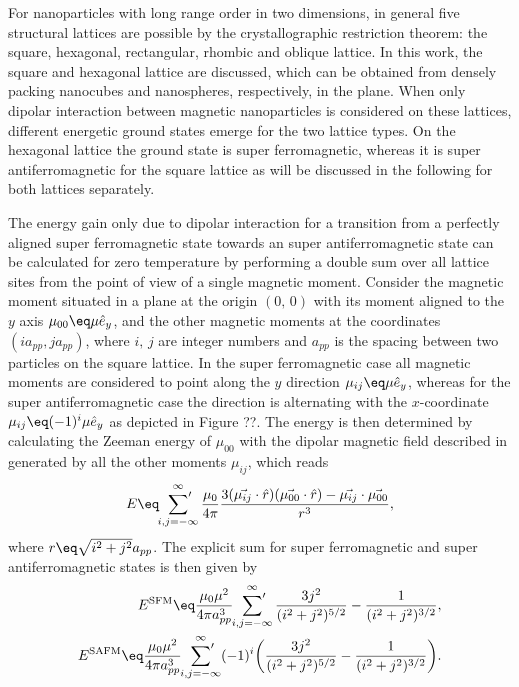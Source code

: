 \documentclass[\main/dresen_thesis.tex]{subfiles}
\begin{document}
  For nanoparticles with long range order in two dimensions, in general five structural lattices are possible by the crystallographic restriction theorem: the square, hexagonal, rectangular, rhombic and oblique lattice.
  In this work, the square and hexagonal lattice are discussed, which can be obtained from densely packing nanocubes and nanospheres, respectively, in the plane.
  When only dipolar interaction between magnetic nanoparticles is considered on these lattices, different energetic ground states emerge for the two lattice types.
  On the hexagonal lattice the ground state is super ferromagnetic, whereas it is super antiferromagnetic for the square lattice as will be discussed in the following for both lattices separately.


  The energy gain only due to dipolar interaction for a transition from a perfectly aligned super ferromagnetic state towards an super antiferromagnetic state can be calculated for zero temperature by performing a double sum over all lattice sites from the point of view of a single magnetic moment.
  Consider the magnetic moment situated in a plane at the origin $(0, \,0)$ with its moment aligned to the $y$ axis $\mu_{00} \eq \mu \hat{e}_y$, and the other magnetic moments at the coordinates $(i a_{pp}, j a_{pp})$, where $i,\, j$ are integer numbers and $a_{pp}$ is the spacing between two particles on the square lattice.
  In the super ferromagnetic case all magnetic moments are considered to point along the $y$ direction $\mu_{ij} \eq \mu \hat{e}_y$, whereas for the super antiferromagnetic case the direction is alternating with the $x$-coordinate $\mu_{ij} \eq (-1)^i \mu \hat{e}_y$ as depicted in Figure ??.
  The energy is then determined by calculating the Zeeman energy of $\mu_{00}$ with the dipolar magnetic field described in  generated by all the other moments $\mu_{ij}$, which reads
  \begin{align}
    E \eq \sideset{}{'}\sum_{i,j=-\infty}^\infty \frac{\mu_0}{4 \pi} \frac{3(\vec{\mu_{ij}} \cdot \hat{r})(\vec{\mu_{00}} \cdot \hat{r}) - \vec{\mu_{ij}} \cdot \vec{\mu_{00}} }{r^3},
  \end{align}
  where $r \eq \sqrt{i^2 + j^2} a_{pp}$.
  The explicit sum for super ferromagnetic and super antiferromagnetic states is then given by
  \begin{align}
    E^\mathrm{SFM} \eq \frac{\mu_0 \mu^2}{4 \pi a^3_{pp}} \sideset{}{'}\sum_{i,j=-\infty}^\infty  \frac{3j^2}{(i^2 + j^2)^{5/2}} - \frac{1}{(i^2 + j^2)^{3/2}} ,\\
    E^\mathrm{SAFM} \eq \frac{\mu_0 \mu^2}{4 \pi a^3_{pp}} \sideset{}{'}\sum_{i,j=-\infty}^\infty (-1)^i \biggl( \frac{3j^2}{(i^2 + j^2)^{5/2}} - \frac{1}{(i^2 + j^2)^{3/2}} \biggr).
  \end{align}
\end{document}
